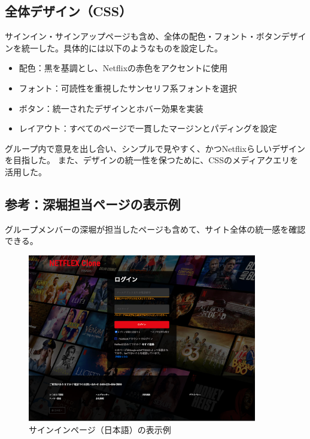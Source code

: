 \documentclass[12pt,a4j]{jarticle}
\begin{document}
\subsection{全体デザイン（CSS）}
サインイン・サインアップページも含め、全体の配色・フォント・ボタンデザインを統一した。具体的には以下のようなものを設定した。
\begin{itemize}
\item 配色：黒を基調とし、Netflixの赤色をアクセントに使用
\item フォント：可読性を重視したサンセリフ系フォントを選択
\item ボタン：統一されたデザインとホバー効果を実装
\item レイアウト：すべてのページで一貫したマージンとパディングを設定
\end{itemize}

グループ内で意見を出し合い、シンプルで見やすく、かつNetflixらしいデザインを目指した。
また、デザインの統一性を保つために、CSSのメディアクエリを活用した。

\subsection{参考：深堀担当ページの表示例}
グループメンバーの深堀が担当したページも含めて、サイト全体の統一感を確認できる。

\begin{figure}[htbp]
\begin{center}
\includegraphics[width=10cm]{login.png}
\caption{サインインページ（日本語）の表示例}\label{fig3}
\end{center}
\end{figure}
\end{document}
